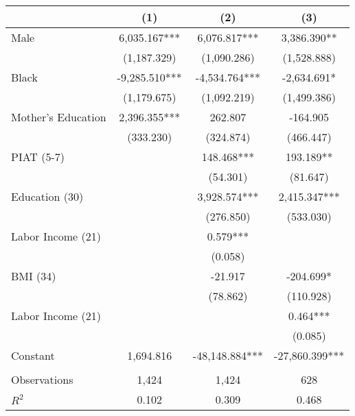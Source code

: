 \begin{tabular}{lccc} \toprule
 & (1) & (2) & (3) \\ \midrule 
Male & 6,035.167*** & 6,076.817*** & 3,386.390** \\
 & (1,187.329) & (1,090.286) & (1,528.888) \\
Black & -9,285.510*** & -4,534.764*** & -2,634.691* \\
 & (1,179.675) & (1,092.219) & (1,499.386) \\
 Mother's Education & 2,396.355*** & 262.807 & -164.905 \\
 & (333.230) & (324.874) & (466.447) \\
PIAT (5-7) &  & 148.468*** & 193.189** \\
 &  & (54.301) & (81.647) \\
Education (30) &  & 3,928.574*** & 2,415.347*** \\
 &  & (276.850) & (533.030) \\
Labor Income (21) &  & 0.579*** &  \\
 &  & (0.058) &  \\
BMI (34)&  & -21.917 & -204.699* \\
 &  & (78.862) & (110.928) \\
Labor Income (21) &  &  & 0.464*** \\
 &  &  & (0.085) \\
Constant & 1,694.816 & -48,148.884*** & -27,860.399*** \\ \\ \midrule 
Observations & 1,424 & 1,424 & 628 \\
$R^2$ & 0.102 & 0.309 & 0.468 \\ \bottomrule
\end{tabular}

